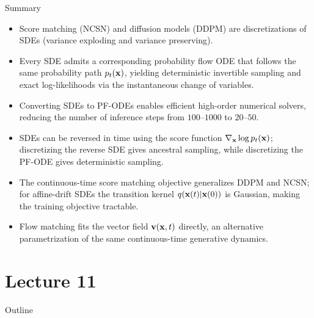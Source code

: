 \documentclass{beamer}
\begin{document}
\begin{frame}{Summary}
	\begin{itemize}
		\item Score matching (NCSN) and diffusion models (DDPM) are discretizations of SDEs (variance exploding and variance preserving).
		\vfill
		\item Every SDE admits a corresponding probability flow ODE that follows the same probability path $p_t(\mathbf{x})$, yielding deterministic invertible sampling and exact log-likelihoods via the instantaneous change of variables.
		\vfill
		\item Converting SDEs to PF-ODEs enables efficient high-order numerical solvers, reducing the number of inference steps from $100$--$1000$ to $20$--$50$.
		\vfill
		\item SDEs can be reversed in time using the score function $\nabla_{\mathbf{x}} \log p_t(\mathbf{x})$; discretizing the reverse SDE gives ancestral sampling, while discretizing the PF-ODE gives deterministic sampling.
		\vfill
		\item The continuous-time score matching objective generalizes DDPM and NCSN; for affine-drift SDEs the transition kernel $q(\mathbf{x}(t) | \mathbf{x}(0))$ is Gaussian, making the training objective tractable.
		\vfill
		\item Flow matching fits the vector field $\mathbf{v}(\mathbf{x}, t)$ directly, an alternative parametrization of the same continuous-time generative dynamics.
	\end{itemize}
\end{frame}

\part{Lecture 11}

\begin{frame}
\titlepage
	\resetonslide
\end{frame}







\begin{frame}{Outline}
	\tableofcontents[part=11]
\end{frame}
\end{document}
